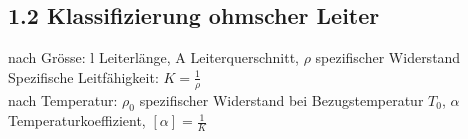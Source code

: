 \subsection*{1.2 Klassifizierung ohmscher Leiter}
nach Grösse:
l Leiterlänge, A Leiterquerschnitt, $\rho$ spezifischer Widerstand\\
Spezifische Leitfähigkeit: $ K = \frac{1}{\rho}$\\
nach Temperatur:
$\rho_0$ spezifischer Widerstand bei Bezugstemperatur $T_0$, $\alpha$ Temperaturkoeffizient, $[\alpha] = \frac{1}{K}$